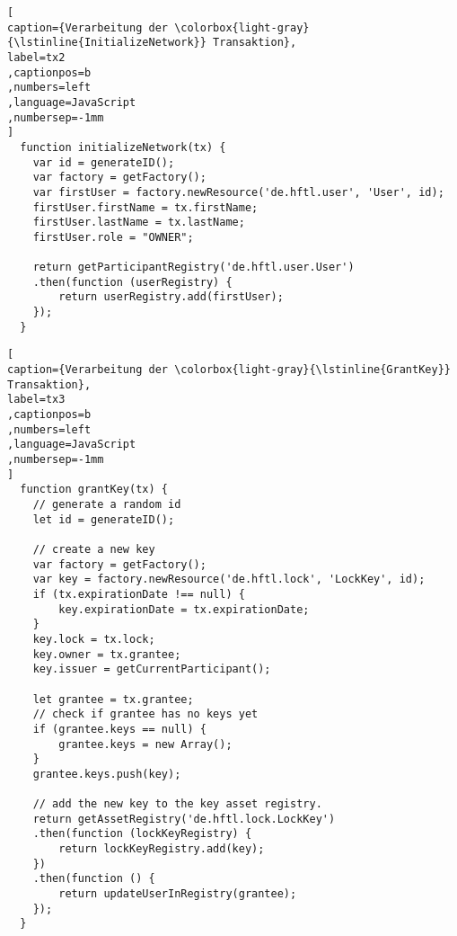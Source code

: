 \begin{lstlisting}[
caption={Verarbeitung der \colorbox{light-gray}{\lstinline{InitializeNetwork}} Transaktion},
label=tx2
,captionpos=b
,numbers=left
,language=JavaScript
,numbersep=-1mm
]
  function initializeNetwork(tx) {
	var id = generateID();
	var factory = getFactory();
	var firstUser = factory.newResource('de.hftl.user', 'User', id);
	firstUser.firstName = tx.firstName;
	firstUser.lastName = tx.lastName;
	firstUser.role = "OWNER";
	
	return getParticipantRegistry('de.hftl.user.User')
	.then(function (userRegistry) {
		return userRegistry.add(firstUser);
	});
  }
\end{lstlisting}
\newpage
\begin{lstlisting}[
caption={Verarbeitung der \colorbox{light-gray}{\lstinline{GrantKey}} Transaktion},
label=tx3
,captionpos=b
,numbers=left
,language=JavaScript
,numbersep=-1mm
]
  function grantKey(tx) {
	// generate a random id
	let id = generateID();
	
	// create a new key
	var factory = getFactory();
	var key = factory.newResource('de.hftl.lock', 'LockKey', id);
	if (tx.expirationDate !== null) {
		key.expirationDate = tx.expirationDate;
	}
	key.lock = tx.lock;
	key.owner = tx.grantee;
	key.issuer = getCurrentParticipant();
	
	let grantee = tx.grantee;
	// check if grantee has no keys yet
	if (grantee.keys == null) {
		grantee.keys = new Array();
	}
	grantee.keys.push(key);
	
	// add the new key to the key asset registry.
	return getAssetRegistry('de.hftl.lock.LockKey')
	.then(function (lockKeyRegistry) {
		return lockKeyRegistry.add(key);
	})
	.then(function () {
		return updateUserInRegistry(grantee);
	});
  }
\end{lstlisting}